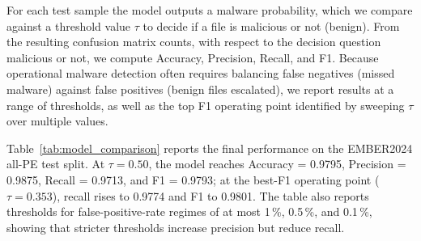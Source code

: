 \documentclass[conference]{IEEEtran}
\begin{document}

For each test sample the model outputs a malware probability, which we compare against a threshold value $\tau$ to decide if a file is malicious or not (benign).
From the resulting confusion matrix counts, with respect to the decision question malicious or not, we compute Accuracy, Precision, Recall, and F1.
Because operational malware detection often requires balancing false negatives (missed malware) against false positives (benign files escalated), we report results at a range of thresholds, as well as the top F1 operating point identified by sweeping $\tau$ over multiple values.


Table~\ref{tab:model_comparison} reports the final performance on the EMBER2024 all-PE test split.
At $\tau=0.50$, the model reaches Accuracy = 0.9795, Precision = 0.9875, Recall = 0.9713, and F1 = 0.9793; at the best-F1 operating point ($\tau=0.353$), recall rises to 0.9774 and F1 to 0.9801.
The table also reports thresholds for false-positive-rate regimes of at most 1\,\%, 0.5\,\%, and 0.1\,\%, showing that stricter thresholds increase precision but reduce recall.
\end{document}

